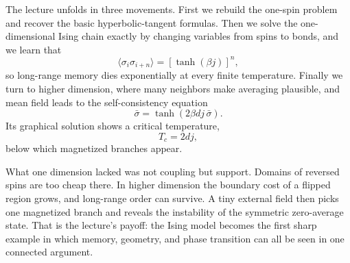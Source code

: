 The lecture unfolds in three movements. First we rebuild the one-spin problem and recover the basic hyperbolic-tangent formulas. Then we solve the one-dimensional Ising chain exactly by changing variables from spins to bonds, and we learn that
\begin{equation}
\langle \sigma_i\sigma_{i+n}\rangle=[\tanh(\beta j)]^n,
\end{equation}
so long-range memory dies exponentially at every finite temperature. Finally we turn to higher dimension, where many neighbors make averaging plausible, and mean field leads to the self-consistency equation
\begin{equation}
\bar{\sigma}=\tanh(2\beta d j\,\bar{\sigma}).
\end{equation}
Its graphical solution shows a critical temperature,
\begin{equation}
T_c=2dj,
\end{equation}
below which magnetized branches appear.

What one dimension lacked was not coupling but support. Domains of reversed spins are too cheap there. In higher dimension the boundary cost of a flipped region grows, and long-range order can survive. A tiny external field then picks one magnetized branch and reveals the instability of the symmetric zero-average state. That is the lecture's payoff: the Ising model becomes the first sharp example in which memory, geometry, and phase transition can all be seen in one connected argument.